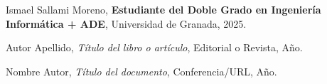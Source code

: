 \begin{thebibliography}{99}

  Ismael Sallami Moreno, \textbf{Estudiante del Doble Grado en Ingeniería Informática + ADE}, Universidad de Granada, 2025.
  
  Autor Apellido, \emph{Título del libro o artículo}, Editorial o Revista, Año.
  
  Nombre Autor, \emph{Título del documento}, Conferencia/URL, Año.
  
  \end{thebibliography}
  
